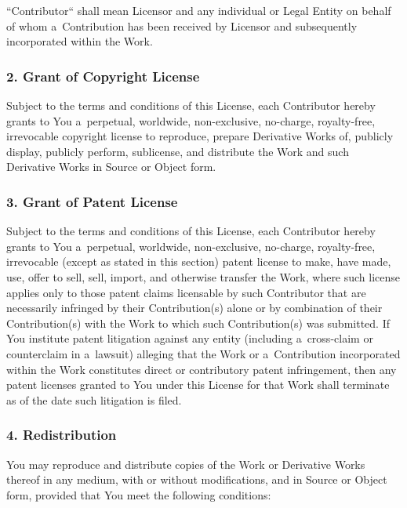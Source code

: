\documentclass[a4paper, 11pt, twoside]{article}
\begin{document}
“Contributor“ shall mean Licensor and any individual or Legal Entity on behalf of whom a~Contribution has been received by Licensor and subsequently incorporated within the Work.

\subsubsection{2. Grant of Copyright License}

Subject to the terms and conditions of this License, each Contributor hereby grants to You a~perpetual, worldwide, non-exclusive, no-charge, royalty-free, irrevocable copyright license to reproduce, prepare Derivative Works of, publicly display, publicly perform, sublicense, and distribute the Work and such Derivative Works in Source or Object form.

\subsubsection{3. Grant of Patent License}

Subject to the terms and conditions of this License, each Contributor hereby grants to You a~perpetual, worldwide, non-exclusive, no-charge, royalty-free, irrevocable (except as stated in this section) patent license to make, have made, use, offer to sell, sell, import, and otherwise transfer the Work, where such license applies only to those patent claims licensable by such Contributor that are necessarily infringed by their Contribution(s) alone or by combination of their Contribution(s) with the Work to which such Contribution(s) was submitted. If You institute patent litigation against any entity (including a~cross-claim or counterclaim in a~lawsuit) alleging that the Work or a~Contribution incorporated within the Work constitutes direct or contributory patent infringement, then any patent licenses granted to You under this License for that Work shall terminate as of the date such litigation is filed.

\subsubsection{4. Redistribution}

You may reproduce and distribute copies of the Work or Derivative Works thereof in any medium, with or without modifications, and in Source or Object form, provided that You meet the following conditions:
\end{document}
